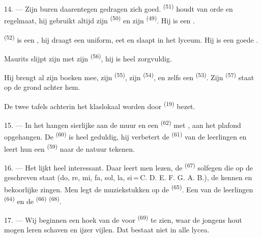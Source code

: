 14. --- Zijn buren daarentegen gedragen zich goed.  \textsuperscript{(51)} houdt
van orde en regelmaat, hij gebruikt altijd zijn
 \textsuperscript{(50)} en zijn 
\textsuperscript{(49)}. Hij is een .

 \textsuperscript{(52)} is een , hij
draagt een uniform, eet en slaapt in het lyceum. Hij is een goede
.

Maurits slijpt zijn  met zijn  \textsuperscript{(56)}, hij is
heel zorgvuldig.

Hij brengt al zijn boeken mee, zijn  \textsuperscript{(55)}, zijn
 \textsuperscript{(54)}, en zelfs een 
\textsuperscript{(53)}. Zijn
 \textsuperscript{(57)} staat op de grond achter hem.

De twee tafels achterin het klaslokaal worden door 
\textsuperscript{(19)} bezet.

\VUsaut{4.6mm}
\VUsaut{3.4mm}

15. --- In het  hangen sierlijke  aan de muur en een
 \textsuperscript{(62)} met , aan het plafond opgehangen. De
 \textsuperscript{(60)} is heel geduldig, hij verbetert de 
\textsuperscript{(61)} van de leerlingen en leert hun een 
\textsuperscript{(59)} naar de natuur tekenen.

16. --- Het  lijkt heel interessant. Daar leert men
 lezen, de  \textsuperscript{(67)} solfegen
die op de  geschreven staat (do, re, mi, fa, sol, la, si\,=\,C. D. E. F. G.
A. B.), de  kennen en bekoorlijke
 zingen. Men legt de muziekstukken op de 
\textsuperscript{(65)}. Een van de leerlingen  \textsuperscript{(64)} en
de  \textsuperscript{(66)}
 \textsuperscript{(68)}.

17. --- Wij beginnen een hoek van de  voor
 \textsuperscript{(69)} te zien, waar de jongens hout
mogen leren schaven en ijzer vijlen. Dat bestaat niet in alle lycea.

